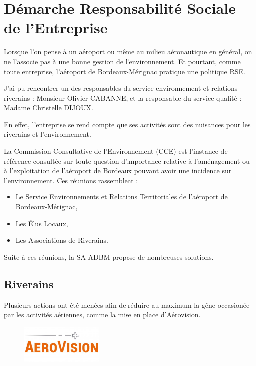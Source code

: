 \newpage

\section{Démarche Responsabilité Sociale de l’Entreprise}


Lorsque l'on pense à un aéroport ou même au milieu aéronautique en général, on ne l'associe pas à une bonne gestion de l'environnement.
Et pourtant, comme toute entreprise, l'aéroport de Bordeaux-Mérignac pratique une politique RSE.

J'ai pu rencontrer un des responsables du service environnement et relations riverains : Monsieur Olivier CABANNE, et la responsable du service qualité : Madame Christelle DIJOUX.

En effet, l'entreprise se rend compte que ses activités sont des nuisances pour les riverains et l'environnement. 

La Commission Consultative de l’Environnement (CCE) est l’instance de référence consultée sur toute question d’importance relative à l’aménagement ou à l’exploitation de l’aéroport de Bordeaux pouvant avoir une incidence sur l’environnement. Ces réunions rassemblent : 

\begin{itemize}
  \item Le Service Environnements et Relations Territoriales de l'aéroport de Bordeaux-Mérignac,
  \item Les Élus Locaux,
  \item Les Associations de Riverains.
\end{itemize}

Suite à ces réunions, la SA ADBM propose de nombreuses solutions.\newline

\subsection{Riverains}

Plusieurs actions ont été menées afin de réduire au maximum la gêne occasionée par les activités aériennes, comme la mise en place d'Aérovision.

\begin{figure}[hbt!]
  \centering
  \includegraphics[width=4cm]{Images/logo_aerovision.jpg}
  \label{fig:logoaerovision}
\end{figure}

